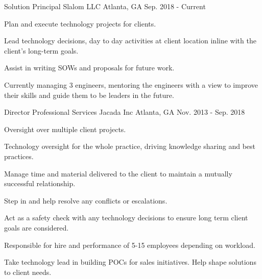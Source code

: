 

\begin{cventries}

  \cventry
    {Solution Principal} %
    {Slalom LLC} %
    {Atlanta, GA} %
    {Sep. 2018 - Current} %
    {
      \begin{cvitems} %
        \item {Plan and execute technology projects for clients.}
        \item {Lead technology decisions, day to day activities at client location inline with the client’s long-term goals.}
        \item {Assist in writing SOWs and proposals for future work.}
        \item {Currently managing 3 engineers, mentoring the engineers with a view to improve their skills and guide them to be leaders in the future.}
      \end{cvitems}
    }
    
  \cventry
  {Director Professional Services} %
  {Jacada Inc} %
  {Atlanta, GA} %
  {Nov. 2013 - Sep. 2018} %
  {
    \begin{cvitems} %
      \item {Oversight over multiple client projects.}
      \item {Technology oversight for the whole practice, driving knowledge sharing and best practices.}
      \item {Manage time and material delivered to the client to maintain a mutually successful relationship.}
      \item {Step in and help resolve any conflicts or escalations.}
      \item {Act as a safety check with any technology decisions to ensure long term client goals are considered.}
      \item {Responsible for hire and performance of 5-15 employees depending on workload.}
      \item {Take technology lead in building POCs for sales initiatives. Help shape solutions to client needs.}
    \end{cvitems}
  }

\end{cventries}
